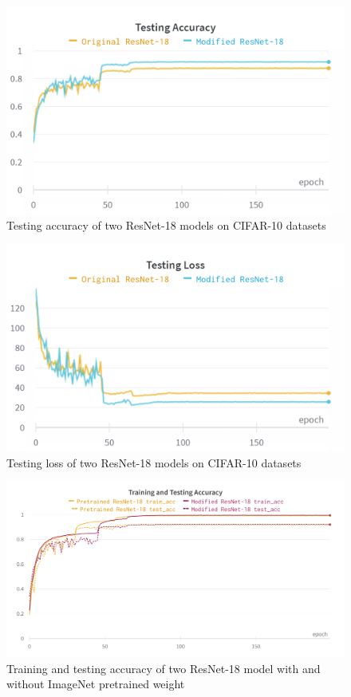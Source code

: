 \documentclass[twocolumn]{extarticle}
\begin{document}
\begin{appendices}
\begin{figure}[H]
\centering
\includegraphics[width=0.9\linewidth]{charts/Section-2-Panel-2-qves7h50b}
\caption{Testing accuracy of two ResNet-18 models on CIFAR-10 datasets}
\label{chart: res_3}
\end{figure}

\begin{figure}[H]
\centering
\includegraphics[width=0.9\linewidth]{charts/Section-2-Panel-3-cw0a3tnrd}
\caption{Testing loss of two ResNet-18 models on CIFAR-10 datasets}
\label{chart: res_4}
\end{figure}

\begin{figure}[H]
\centering
\includegraphics[width=0.9\linewidth]{charts/resnet-18-cifar-10-pretrained-acc}
\caption{Training and testing accuracy of two ResNet-18 model with and without ImageNet pretrained weight}
\label{chart:resnet-18-cifar-10-pretrained-acc}
\end{figure}


\end{appendices}
\end{document}
